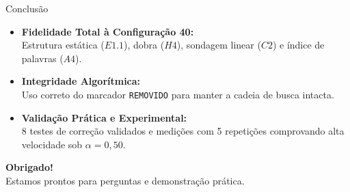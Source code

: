 \documentclass[aspectratio=169,11pt]{beamer}
\begin{document}
\begin{frame}{Conclusão}
  \begin{itemize}
    \setlength{\itemsep}{1em}
    \item \textbf{Fidelidade Total à Configuração 40:}\\
      Estrutura estática ($E1.1$), dobra ($H4$), sondagem linear ($C2$) e índice de palavras ($A4$).
    \item \textbf{Integridade Algorítmica:}\\
      Uso correto do marcador \texttt{REMOVIDO} para manter a cadeia de busca intacta.
    \item \textbf{Validação Prática e Experimental:}\\
      8 testes de correção validados e medições com 5 repetições comprovando alta velocidade sob $\alpha = 0,50$.
  \end{itemize}

  \vspace{1.5em}
  \begin{center}
    \Large \textbf{Obrigado!} \\
    \vspace{0.4em}
    \normalsize Estamos prontos para perguntas e demonstração prática.
  \end{center}
\end{frame}
\end{document}

